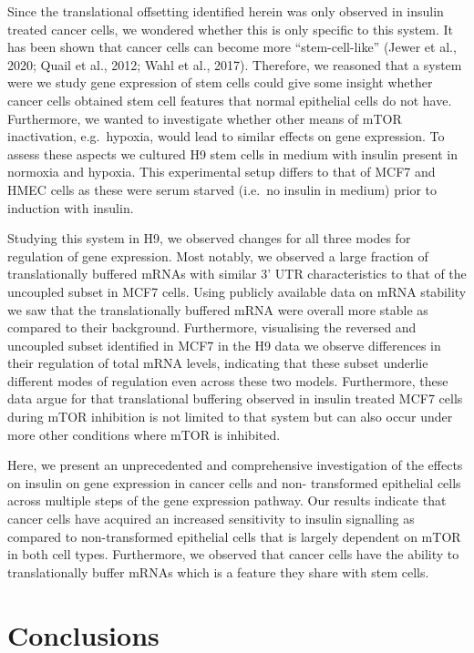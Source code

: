 \documentclass[12pt,openany]{book}
\begin{document}
Since the translational offsetting identified herein was only observed
in insulin treated cancer cells, we wondered whether this is only
specific to this system. It has been shown that cancer cells can become
more ``stem-cell-like'' (Jewer et al., 2020; Quail et al., 2012; Wahl et
al., 2017). Therefore, we reasoned that a system were we study gene
expression of stem cells could give some insight whether cancer cells
obtained stem cell features that normal epithelial cells do not have.
Furthermore, we wanted to investigate whether other means of mTOR
inactivation, e.g.~hypoxia, would lead to similar effects on gene
expression. To assess these aspects we cultured H9 stem cells in medium
with insulin present in normoxia and hypoxia. This experimental setup
differs to that of MCF7 and HMEC cells as these were serum starved
(i.e.~no insulin in medium) prior to induction with insulin.

Studying this system in H9, we observed changes for all three modes for
regulation of gene expression. Most notably, we observed a large
fraction of translationally buffered mRNAs with similar 3' UTR
characteristics to that of the uncoupled subset in MCF7 cells. Using
publicly available data on mRNA stability we saw that the
translationally buffered mRNA were overall more stable as compared to
their background. Furthermore, visualising the reversed and uncoupled
subset identified in MCF7 in the H9 data we observe differences in their
regulation of total mRNA levels, indicating that these subset underlie
different modes of regulation even across these two models. Furthermore,
these data argue for that translational buffering observed in insulin
treated MCF7 cells during mTOR inhibition is not limited to that system
but can also occur under more other conditions where mTOR is inhibited.

Here, we present an unprecedented and comprehensive investigation of the
effects on insulin on gene expression in cancer cells and non-
transformed epithelial cells across multiple steps of the gene
expression pathway. Our results indicate that cancer cells have acquired
an increased sensitivity to insulin signalling as compared to
non-transformed epithelial cells that is largely dependent on mTOR in
both cell types. Furthermore, we observed that cancer cells have the
ability to translationally buffer mRNAs which is a feature they share
with stem cells.

\chapter{Conclusions}
\end{document}
